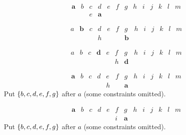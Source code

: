 \documentclass[pagesize, twoside=off, bibliography=totoc, DIV=calc, fontsize=12pt, a4paper]{scrartcl}
\begin{document}
\begin{example}[$\Delta^\text{min} = 2$; $\delta = 1$; $\lprof(x) = (0, 3)$ thus cl $1$]
	\label{ex:06}
	\begin{equation}
		\begin{array}{lllllllllllll}
			\bm{a}	& b	& c	& d	& e	& f	& g	& h	& i & j & k & l & m\\
			& & e & \bm{a}
		\end{array}
	\end{equation}
\end{example}

\begin{example}[$\Delta^\text{min} = 2$; $\delta = 1$; $\lprof(x) = (1, 6)$ thus cl $11$]
	\begin{equation}
		\begin{array}{lllllllllllll}
			a	& \bm{b}	& c	& d	& e	& f	& g	& h	& i & j & k & l & m\\
			& & & h & & & \bm{b}
		\end{array}
	\end{equation}
\end{example}

\begin{example}[$\Delta^\text{min} = 2$; $\delta = 1$; $\lprof(x) = (3, 6)$ thus cl $11$]
	\begin{equation}
		\begin{array}{lllllllllllll}
			a	& b	& c	& \bm{d}	& e	& f	& g	& h	& i & j & k & l & m\\
			& & & & & h & \bm{d}
		\end{array}
	\end{equation}
\end{example}

\begin{example}[spread $x$: 6, spread $y$: 3, $\max \lprof(y) = 7$]
	\begin{equation}
		\begin{array}{lllllllllllll}
			\bm{a}	& b	& c	& d	& e	& f	& g	& h	& i & j & k & l & m\\
			& & & & h & & \bm{a}
		\end{array}
	\end{equation}
	Put $\{b, c, d, e, f, g\}$ after $a$ (some constraints omitted).
\end{example}

\begin{example}[spread $x$: 6, spread $y$: 3, $\max \lprof(y) = 8$]
	\begin{equation}
		\begin{array}{lllllllllllll}
			\bm{a}	& b	& c	& d	& e	& f	& g	& h	& i & j & k & l & m\\
			& & & & & i & \bm{a}
		\end{array}
	\end{equation}
	Put $\{b, c, d, e, f, g\}$ after $a$ (some constraints omitted).
\end{example}
\end{document}
